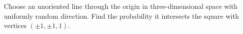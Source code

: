 Choose an unoriented line through the origin in three-dimensional space with uniformly random direction. Find the probability it intersects the square with vertices $(\pm1,\pm1,1)$.
